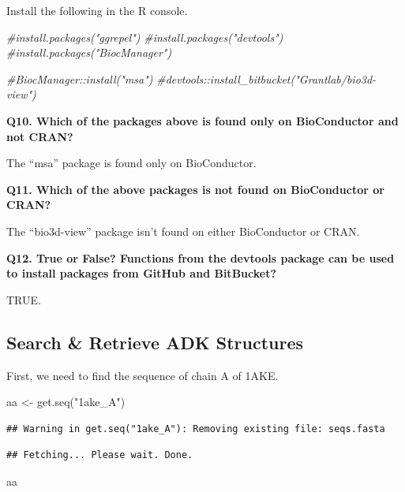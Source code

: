 \documentclass[
]{article}
\newenvironment{Shaded}{\begin{snugshade}}{\end{snugshade}}
\newcommand{\CommentTok}[1]{\textcolor[rgb]{0.56,0.35,0.01}{\textit{#1}}}
\newcommand{\FunctionTok}[1]{\textcolor[rgb]{0.00,0.00,0.00}{#1}}
\newcommand{\NormalTok}[1]{#1}
\newcommand{\OtherTok}[1]{\textcolor[rgb]{0.56,0.35,0.01}{#1}}
\newcommand{\StringTok}[1]{\textcolor[rgb]{0.31,0.60,0.02}{#1}}
\begin{document}
Install the following in the R console.

\begin{Shaded}
\begin{Highlighting}[]
\CommentTok{\#install.packages("ggrepel")}
\CommentTok{\#install.packages("devtools")}
\CommentTok{\#install.packages("BiocManager")}

\CommentTok{\#BiocManager::install("msa")}
\CommentTok{\#devtools::install\_bitbucket("Grantlab/bio3d{-}view")}
\end{Highlighting}
\end{Shaded}

\textbf{Q10. Which of the packages above is found only on BioConductor
and not CRAN?}

The ``msa'' package is found only on BioConductor.

\textbf{Q11. Which of the above packages is not found on BioConductor or
CRAN?}

The ``bio3d-view'' package isn't found on either BioConductor or CRAN.

\textbf{Q12. True or False? Functions from the devtools package can be
used to install packages from GitHub and BitBucket?}

TRUE.

\hypertarget{search-retrieve-adk-structures}{%
\subsection{Search \& Retrieve ADK
Structures}\label{search-retrieve-adk-structures}}

First, we need to find the sequence of chain A of 1AKE.

\begin{Shaded}
\begin{Highlighting}[]
\NormalTok{aa }\OtherTok{\textless{}{-}} \FunctionTok{get.seq}\NormalTok{(}\StringTok{"1ake\_A"}\NormalTok{)}
\end{Highlighting}
\end{Shaded}

\begin{verbatim}
## Warning in get.seq("1ake_A"): Removing existing file: seqs.fasta
\end{verbatim}

\begin{verbatim}
## Fetching... Please wait. Done.
\end{verbatim}

\begin{Shaded}
\begin{Highlighting}[]
\NormalTok{aa}
\end{Highlighting}
\end{Shaded}
\end{document}
